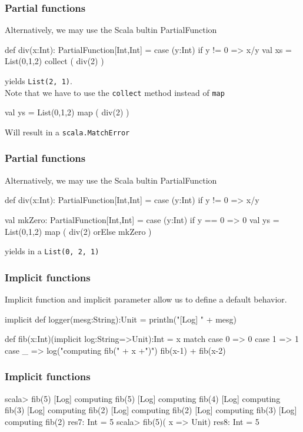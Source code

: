 \documentclass{beamer}
\newcommand{\beb}{\begin{exampleblock}}
\newcommand{\eeb}{\end{exampleblock}}
\begin{document}
\begin{frame}[fragile]
\frametitle{Partial functions}
Alternatively, we may use the Scala bultin PartialFunction 
\beb{}
\begin{code}
def div(x:Int): PartialFunction[Int,Int] = {
    case (y:Int) if y != 0 => x/y
}
val xs = List(0,1,2) collect ( div(2) ) 
\end{code}
\eeb
yields {\tt List(2, 1)}. \\ 
Note that we have to use the {\tt collect} method instead of {\tt map} 
\beb{}
\begin{code}
val ys = List(0,1,2) map ( div(2) ) 
\end{code}
\eeb
Will result in a {\tt scala.MatchError}
\end{frame}
\begin{frame}[fragile]
\frametitle{Partial functions}
Alternatively, we may use the Scala bultin PartialFunction 
\beb{}
\begin{code}
def div(x:Int): PartialFunction[Int,Int] = {
    case (y:Int) if y != 0 => x/y
}

val mkZero: PartialFunction[Int,Int] = {
  case (y:Int) if y == 0 => 0
}
val ys = List(0,1,2) map ( div(2) orElse mkZero ) 
\end{code}
\eeb
yields in a {\tt List(0, 2, 1)}
\end{frame}
\begin{frame}[fragile]
\frametitle{Implicit functions}
Implicit function and implicit parameter allow us to define a default behavior.
\beb{}
\begin{code}
implicit def logger(mesg:String):Unit = { 
    println("[Log] " + mesg)
}

def fib(x:Int)(implicit log:String=>Unit):Int = {
  x match  {
    case 0 => 0
    case 1 => 1
    case _ => {
      log("computing fib(" + x +")")
      fib(x-1) + fib(x-2)         
    }
  }
}
\end{code}
\eeb
\end{frame}
\begin{frame}[fragile]
\frametitle{Implicit functions}

\begin{code}
scala> fib(5)
[Log] computing fib(5)
[Log] computing fib(4)
[Log] computing fib(3)
[Log] computing fib(2)
[Log] computing fib(2)
[Log] computing fib(3)
[Log] computing fib(2)
res7: Int = 5
scala> fib(5)( x => Unit) 
res8: Int = 5
\end{code}
\end{frame}
\end{document}
